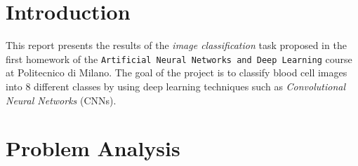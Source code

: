 \documentclass[11pt]{article}
\begin{document}
\begin{multicols}{2}

      \section{Introduction}


      This report presents the results of the \textit{image classification}
      task proposed in the first homework of the \texttt{Artificial Neural Networks and Deep Learning} course at Politecnico di Milano. The goal of the project is to classify blood cell images into 8 different classes by using deep learning techniques such as \textit{Convolutional Neural Networks} (CNNs)\cite{NIPS1989_53c3bce6}.

      \section{Problem Analysis}


\end{multicols}
\end{document}
